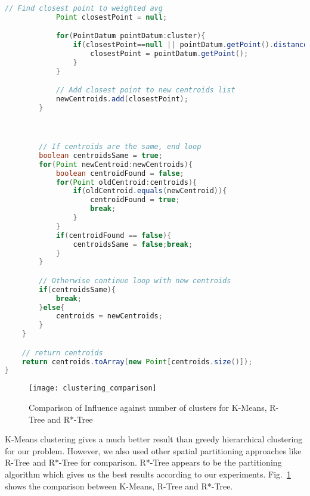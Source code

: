 \begin{lstlisting}[language=JAVA, caption=Algorithm for K means, label=alg:kmeans]
            // Find closest point to weighted avg
            Point closestPoint = null;

            for(PointDatum pointDatum:cluster){
                if(closestPoint==null || pointDatum.getPoint().distance(avg_point) < closestPoint.distance(avg_point)){
                    closestPoint = pointDatum.getPoint();
                }
            }

            // Add closest point to new centroids list
            newCentroids.add(closestPoint);
        }



        // If centroids are the same, end loop
        boolean centroidsSame = true;
        for(Point newCentroid:newCentroids){
            boolean centroidFound = false;
            for(Point oldCentroid:centroids){
                if(oldCentroid.equals(newCentroid)){
                    centroidFound = true;
                    break;
                }
            }
            if(centroidFound == false){
                centroidsSame = false;break;
            }
        }

        // Otherwise continue loop with new centroids
        if(centroidsSame){
            break;
        }else{
            centroids = newCentroids;
        }
    }

    // return centroids
    return centroids.toArray(new Point[centroids.size()]);
}
\end{lstlisting}

\begin{figure}[h]
\texttt{[image: clustering\_comparison]}
\caption{Comparison of Influence against number of clusters for K-Means, R-Tree and R*-Tree}
\label{fig:clustering_comparison}
\end{figure}

K-Means clustering gives a much better result than greedy hierarchical clustering for our problem. However, we also used other spatial partitioning approaches like R-Tree and R*-Tree for comparison. R*-Tree appears to be the partitioning algorithm which gives us the best results according to our experiments. Fig.~\ref{fig:clustering_comparison} shows the comparison between K-Means, R-Tree and R*-Tree.

